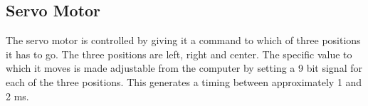 \subsection{Servo Motor}
The servo motor is controlled by giving it a command to which of three positions it has to go.
The three positions are left, right and center.
The specific value to which it moves is made adjustable from the computer by setting a 9 bit signal for each of the three positions.
This generates a timing between approximately 1 and 2 ms.



